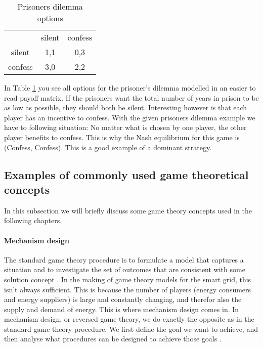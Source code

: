 \begin{table}[h]
\centering
\begin{tabular}{ccc}
                             & silent                   & confess                   \\ \cline{2-3} 
\multicolumn{1}{c|}{silent}  & \multicolumn{1}{c|}{1,1} & \multicolumn{1}{c|}{0,3} \\ \cline{2-3} 
\multicolumn{1}{c|}{confess} & \multicolumn{1}{c|}{3,0} & \multicolumn{1}{c|}{2,2} \\ \cline{2-3} 
\end{tabular}
\caption{Prisoners dilemma options}
\label{prisoners-d}
\end{table}

In Table \ref{prisoners-d} you see all options for the prisoner's dilemma modelled in an easier to read payoff matrix. If the prisoners want the total number of years in prison to be as low as possible, they should both be silent. Interesting however is that each player has an incentive to confess. With the given prisoners dilemma example we have to following situation: No matter what is chosen by one player, the other player benefits to confess. This is why the Nash equilibrium for this game is (Confess, Confess). This is a good example of a dominant strategy. 

\subsection{Examples of commonly used game theoretical concepts}
In this subsection we will briefly discuss some game theory concepts used in the following chapters. 

\paragraph{Mechanism design}
The standard game theory procedure is to formulate a model that
captures a situation and to investigate the set of outcomes that are
consistent with some solution concept \cite{CourseInGameTheory}. In the making of game theory models for the smart grid, this isn't always sufficient. This is because the number of players (energy consumers and energy suppliers) is large and constantly changing, and therefor also the supply and demand of energy. This is where mechanism design comes in. In mechanism design, or reversed game theory, we do exactly the opposite as in the standard game theory procedure. We first define the goal we want to achieve, and then analyse what procedures can be designed to achieve those goals \cite{SalfatiRabinovici2014}. 

